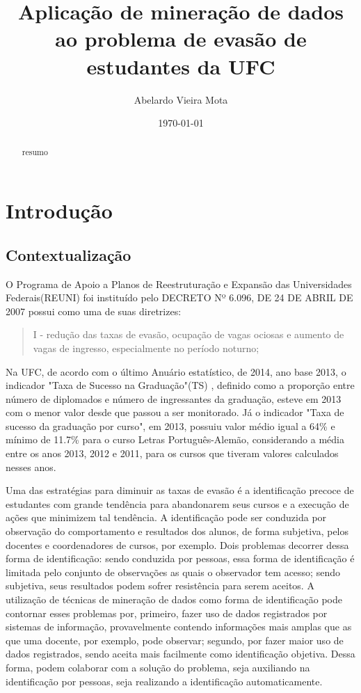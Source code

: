 \documentclass[a4paper]{article}
\title{Aplicação de mineração de dados ao problema de evasão de estudantes da UFC}
\author{Abelardo Vieira Mota}
\date{\today}
\begin{document}
\maketitle

\begin{abstract}
resumo
\end{abstract}

\tableofcontents

\section{Introdução}

\subsection{Contextualização}
O Programa de Apoio a Planos de Reestruturação e Expansão das Universidades Federais(REUNI) foi instituído pelo DECRETO Nº 6.096, DE 24 DE ABRIL DE 2007  possui como uma de suas diretrizes:
\begin{quote}
I - redução das taxas de evasão, ocupação de vagas ociosas e aumento de vagas de ingresso, especialmente no período noturno;
\end{quote}

Na UFC, de acordo com o último Anuário estatístico, de 2014, ano base 2013, o indicador "Taxa de Sucesso na Graduação"(TS) , definido como a proporção entre número de diplomados e número de ingressantes da graduação, esteve em 2013 com o menor valor desde que passou a ser monitorado. Já o indicador "Taxa de sucesso da graduação por curso", em 2013, possuiu valor médio igual a 64\% e mínimo de 11.7\% para o curso Letras Português-Alemão, considerando a média entre os anos 2013, 2012 e 2011, para os cursos que tiveram valores calculados nesses anos.

Uma das estratégias para diminuir as taxas de evasão é a identificação precoce de estudantes com grande tendência para abandonarem seus cursos e a execução de ações que minimizem tal tendência. A identificação pode ser conduzida por observação do comportamento e resultados dos alunos, de forma subjetiva, pelos docentes e coordenadores de cursos, por exemplo. Dois problemas decorrer dessa forma de identificação: sendo conduzida por pessoas, essa forma de identificação é limitada pelo conjunto de observações as quais o observador tem acesso; sendo subjetiva, seus resultados podem sofrer resistência para serem aceitos. A utilização de técnicas de mineração de dados como forma de identificação pode contornar esses problemas por, primeiro, fazer uso de dados registrados por sistemas de informação, provavelmente contendo informações mais amplas que as que uma docente, por exemplo, pode observar; segundo, por fazer maior uso de dados registrados, sendo aceita mais facilmente como identificação objetiva. Dessa forma, podem colaborar com a solução do problema, seja auxiliando na identificação por pessoas, seja realizando a identificação automaticamente.
\end{document}
